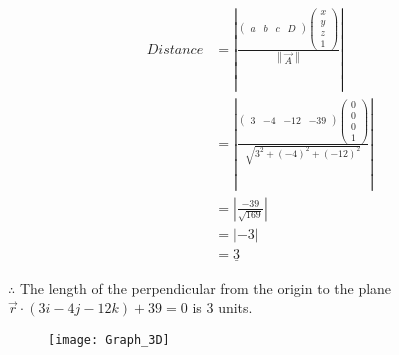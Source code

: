 \documentclass[11pt, oneside, twocolumn, reqno]{article}   	%
\newcommand{\myvec}[1]{\ensuremath{\begin{pmatrix}#1\end{pmatrix}}}
\providecommand{\norm}[1]{\left\lVert#1\right\rVert}
\providecommand{\abs}[1]{\left\vert#1\right\vert}
\providecommand{\brak}[1]{\ensuremath{\left(#1\right)}}
\begin{document}
\begin{align}
Distance &= \abs{\frac{\myvec{a & b & c & D} \myvec{x \\ y \\ z \\ 1}}{\norm{\vec{A}}}}\\
&= \abs{\frac{\myvec{3 & -4 & -12 & -39} \myvec{0 \\ 0 \\ 0 \\ 1}}{\sqrt{3^{2} + \brak{-4}^{2} + \brak{-12}^{2}}}}\\
&= \abs{\frac{-39}{\sqrt{169}}}\\
&= \abs{-3}\\
&= \underline{3}
\end{align}

$\therefore$ The length of the perpendicular from the origin to the plane $\vec{r} \cdot \brak{3i - 4j - 12k} + 39 = 0$ is \underline{$3$} units.

\begin{figure}[h!]
\texttt{[image: Graph\_3D]}
\end{figure}
\end{document}
